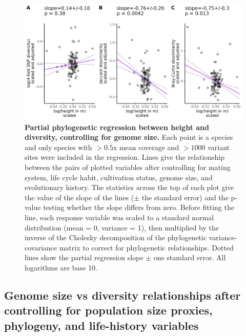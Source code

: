 \documentclass[12pt]{article}
\begin{document}
\begin{figure}[H]
    \centering
    \includegraphics[width=\textwidth]{figures/appendix_d/height_vs_diversity_genome-size-corrected_2024-12-12.jpg}
    \caption{\textbf{Partial phylogenetic regression between height and diversity, controlling for genome size.} Each point is a species and only species with $>0.5$x mean coverage and $>1000$ variant sites were included in the regression. Lines give the relationship between the pairs of plotted variables after controlling for mating system, life cycle habit, cultivation status, genome size, and evolutionary history. The statistics across the top of each plot give the value of the slope of the lines ($\pm$ the standard error) and the p-value testing whether the slope differs from zero. Before fitting the line, each response variable was scaled to a standard normal distribution (mean = 0, variance = 1), then multiplied by the inverse of the Cholesky decomposition of the phylogenetic variance-covariance matrix to correct for phylogenetic relationships. Dotted lines show the partial regression slope $\pm$ one standard error. All logarithms are base 10.}
\end{figure}

\subsection*{Genome size vs diversity relationships after controlling for population size proxies, phylogeny, and life-history variables}
\end{document}
